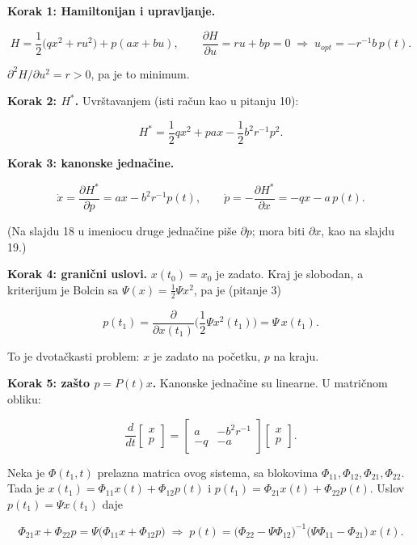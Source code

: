 \documentclass[11pt,a4paper,parskip=half,headsepline,numbers=noenddot]{scrartcl}
\begin{document}
\textbf{Korak 1: Hamiltonijan i upravljanje.}

\[H = \frac12\big(qx^2 + ru^2\big) + p(ax + bu), \qquad \frac{\partial H}{\partial u} = ru + bp = 0 \;\Rightarrow\; u_{opt} = -r^{-1}b\,p(t) .\]

\(\partial^2H/\partial u^2 = r > 0\), pa je to minimum.

\textbf{Korak 2: \(H^*\).} Uvrštavanjem (isti račun kao u pitanju 10):

\[H^* = \frac12qx^2 + pax - \frac12b^2r^{-1}p^2 .\]

\textbf{Korak 3: kanonske jednačine.}

\[\dot x = \frac{\partial H^*}{\partial p} = ax - b^2r^{-1}p(t), \qquad \dot p = -\frac{\partial H^*}{\partial x} = -qx - a\,p(t) .\]

(Na slajdu 18 u imeniocu druge jednačine piše \(\partial p\); mora biti \(\partial x\), kao na slajdu 19.)

\textbf{Korak 4: granični uslovi.} \(x(t_0) = x_0\) je zadato. Kraj je slobodan, a kriterijum je Bolcin sa \(\Psi(x) = \frac12\Psi x^2\), pa je (pitanje 3)

\[p(t_1) = \frac{\partial}{\partial x(t_1)}\Big(\frac12\Psi x^2(t_1)\Big) = \Psi\,x(t_1) .\]

To je dvotačkasti problem: \(x\) je zadato na početku, \(p\) na kraju.

\textbf{Korak 5: zašto \(p = P(t)x\).} Kanonske jednačine su linearne. U matričnom obliku:

\[\frac{d}{dt}\begin{bmatrix} x \\ p \end{bmatrix} = \begin{bmatrix} a & -b^2r^{-1} \\ -q & -a \end{bmatrix}\begin{bmatrix} x \\ p \end{bmatrix} .\]

Neka je \(\Phi(t_1, t)\) prelazna matrica ovog sistema, sa blokovima \(\Phi_{11}, \Phi_{12}, \Phi_{21}, \Phi_{22}\). Tada je \(x(t_1) = \Phi_{11}x(t) + \Phi_{12}p(t)\) i \(p(t_1) = \Phi_{21}x(t) + \Phi_{22}p(t)\). Uslov \(p(t_1) = \Psi x(t_1)\) daje

\[\Phi_{21}x + \Phi_{22}p = \Psi\big(\Phi_{11}x + \Phi_{12}p\big) \;\Rightarrow\; p(t) = \big(\Phi_{22} - \Psi\Phi_{12}\big)^{-1}\big(\Psi\Phi_{11} - \Phi_{21}\big)\,x(t) .\]
\end{document}
